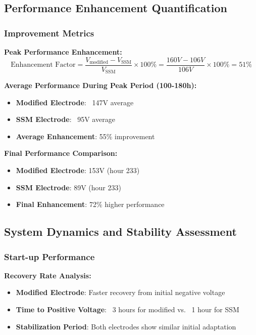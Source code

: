 \documentclass[12pt,a4paper]{article}
\begin{document}
\subsection{Performance Enhancement Quantification}

\subsubsection{Improvement Metrics}

\textbf{Peak Performance Enhancement:}
\begin{equation}
\text{Enhancement Factor} = \frac{V_{\text{modified}} - V_{\text{SSM}}}{V_{\text{SSM}}} \times 100\% = \frac{160V - 106V}{106V} \times 100\% = 51\%
\end{equation}

\textbf{Average Performance During Peak Period (100-180h):}
\begin{itemize}
    \item \textbf{Modified Electrode}: ~147V average
    \item \textbf{SSM Electrode}: ~95V average
    \item \textbf{Average Enhancement}: 55\% improvement
\end{itemize}

\textbf{Final Performance Comparison:}
\begin{itemize}
    \item \textbf{Modified Electrode}: 153V (hour 233)
    \item \textbf{SSM Electrode}: 89V (hour 233)
    \item \textbf{Final Enhancement}: 72\% higher performance
\end{itemize}

\subsection{System Dynamics and Stability Assessment}

\subsubsection{Start-up Performance}

\textbf{Recovery Rate Analysis:}
\begin{itemize}
    \item \textbf{Modified Electrode}: Faster recovery from initial negative voltage
    \item \textbf{Time to Positive Voltage}: ~3 hours for modified vs. ~1 hour for SSM
    \item \textbf{Stabilization Period}: Both electrodes show similar initial adaptation
\end{itemize}
\end{document}

